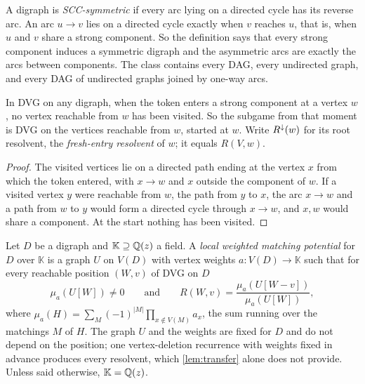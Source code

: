 \begin{definition*}
A digraph is \emph{SCC-symmetric} if every arc lying on a directed cycle has its reverse arc. An arc $u\to v$ lies on a directed cycle exactly when $v$ reaches $u$, that is, when $u$ and $v$ share a strong component. So the definition says that every strong component induces a symmetric digraph and the asymmetric arcs are exactly the arcs between components. The class contains every DAG, every undirected graph, and every DAG of undirected graphs joined by one-way arcs.
\end{definition*}

\begin{lemma}\label{lem:entry}
In DVG on any digraph, when the token enters a strong component at a vertex $w$, no vertex reachable from $w$ has been visited. So the subgame from that moment is DVG on the vertices reachable from $w$, started at $w$. Write $R^{\downarrow}(w)$ for its root resolvent, the \emph{fresh-entry resolvent} of $w$; it equals $R(V,w)$.
\end{lemma}
\begin{proof}
The visited vertices lie on a directed path ending at the vertex $x$ from which the token entered, with $x\to w$ and $x$ outside the component of $w$. If a visited vertex $y$ were reachable from $w$, the path from $y$ to $x$, the arc $x\to w$ and a path from $w$ to $y$ would form a directed cycle through $x\to w$, and $x,w$ would share a component. At the start nothing has been visited.
\end{proof}

\begin{definition*}
Let $D$ be a digraph and $\mathbb K\supseteq\mathbb{Q}(z)$ a field. A \emph{local weighted matching potential} for $D$ over $\mathbb K$ is a graph $U$ on $V(D)$ with vertex weights $a\colon V(D)\to\mathbb K$ such that for every reachable position $(W,v)$ of DVG on $D$
\[
\mu_a(U[W])\neq0\qquad\text{and}\qquad R(W,v)=\frac{\mu_a(U[W-v])}{\mu_a(U[W])},
\]
where $\mu_a(H)=\sum_{M}(-1)^{|M|}\prod_{x\notin V(M)}a_x$, the sum running over the matchings $M$ of $H$. The graph $U$ and the weights are fixed for $D$ and do not depend on the position; one vertex-deletion recurrence with weights fixed in advance produces every resolvent, which \cref{lem:transfer} alone does not provide. Unless said otherwise, $\mathbb K=\mathbb{Q}(z)$.
\end{definition*}

